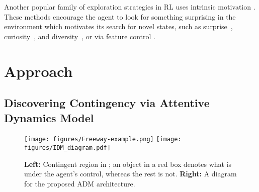 \documentclass{article} \usepackage{iclr,times}
\newcommand{\ADM}{{ADM}}
\begin{document}
\vspace*{-3pt}
Another popular family of exploration strategies in RL uses intrinsic motivation
\citep{Schmidhuber:1991,Chentanez:NIPS2004:Intrinsic,Oudeyer:2009,Barto:2013:intrinsic}. These methods encourage the agent to look for something surprising in the environment which motivates its search for novel states,
such as surprise~\citep{Achiam:1703.01732},
curiosity~\citep{Pathak:ICML2017:Curiosity,Burda:2018:Curiosity},
and diversity~\citep{Eysenbach:2018uc},
or via feature control \citep{Jaderberg:ICLR2017:RLAux,Dilokthanakul:2017:IntrinsicMotivation}.














 




\vspace*{-.2cm}
\section{Approach}
\vspace*{-.10cm}
\label{sec:approach}

\newcommand{\minus}{\scalebox{0.75}[1.0]{$-$}}


\vspace*{-5pt}



\setlength{\abovedisplayskip}{4pt}
\setlength{\belowdisplayskip}{3pt}



\subsection{Discovering Contingency via Attentive Dynamics Model}
\label{sec:dynamics}
\vspace*{-5pt}



\begin{figure}[tb]
\vspace*{-5pt}
\begin{center}
\hspace*{1pt}
    \texttt{[image: figures/Freeway-example.png]}
    \hfill
    \texttt{[image: figures/IDM\_diagram.pdf]}
\caption{
        {\bf Left:} Contingent region in \Freeway; an object in a red box denotes what is under the agent's control, whereas the rest is not.
        {\bf Right:} A diagram for the proposed \ADM{} architecture.
        }
    \label{fig:figure1}
\end{center}
\vspace*{-0.4cm}
\end{figure}
\end{document}
